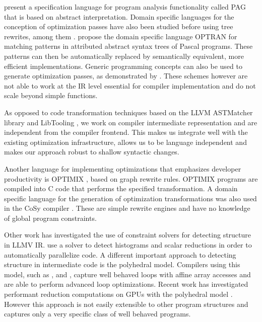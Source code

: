     \citet{Martin1998} present a specification language for program analysis
    functionality called PAG that is based on abstract interpretation.
    Domain specific languages for the conception of optimization passes have
    also been studied before using tree rewrites, among them
    \citet{Olmos:2005:CSD:2136624.2136643}.
    \citet{Lipps1989} propose the domain specific language OPTRAN for matching
    patterns in attributed abstract syntax trees of Pascal programs.
    These patterns can then be automatically replaced by semantically
    equivalent, more efficient implementations. 
    Generic programming
    concepts can also be used to generate optimization passes, as
    demonstrated by \cite{Willcock:2009:RGP:1621607.1621611}.  These
    schemes however are not able to work at the IR level essential for
    compiler implementation and do not scale beyond simple functions.

    As opposed to code transformation techniques based on the LLVM ASTMatcher
    library and LibTooling \citep{be0fa11ddb194bde86a9dab8589b779c}, we work on
    compiler intermediate representation and are independent from the compiler
    frontend.
    This makes us integrate well with the existing optimization infrastructure,
    allows us to be language independent and makes our approach robust to
    shallow syntactic changes.

    Another language for implementing optimizations that emphasizes developer
    productivity is OPTIMIX \citep{Assmann1996,Assmann98optimix}, based on graph
    rewrite rules.
    OPTIMIX programs are compiled into C code that performs the specified
    transformation.
    A domain specific language for the generation of optimization
    transformations was also used in the CoSy compiler \citep{Alt1994}.
    These are simple rewrite engines and have no knowledge of global program
    constraints.

    Other work has investigated the use of constraint solvers for
    detecting structure in LLMV IR.
    \citet{ginsbach2017discovery} use a solver to detect histograms and
    scalar reductions in order to automatically parallelize code.
    A different important approach to detecting structure in intermediate
    code is the polyhedral model.
    Compilers using this model, such as
    \citet{Lengauer2012Polly}, \citet{Baskaran:2010:ACC:2175462.2175482} and
    \citet{Verdoolaege:2013:PPC:2400682.2400713}, capture well behaved
    loops with affine array accesses and are able to perform advanced loop
    optimizations.
    Recent work has investigated performant reduction computations on GPUs with
    the polyhedral model \citep{Reddy2016Reduction}.
    However this approach is not easily extensible to other program structures
    and captures only a very specific class of well behaved programs.

